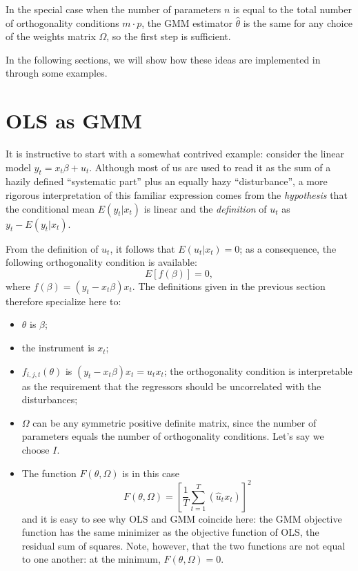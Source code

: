 In the special case when the number of parameters $n$ is equal to the
total number of orthogonality conditions $m \cdot p$, the GMM
estimator $\hat{\theta}$ is the same for any choice of the weights
matrix $\Omega$, so the first step is sufficient.

In the following sections, we will show how these ideas are
implemented in  through some examples.

\section{OLS as GMM}
\label{sec:gmm-ols}

It is instructive to start with a somewhat contrived example: consider
the linear model $y_t = x_t \beta + u_t$.  Although most of us
are used to read it as the sum of a hazily defined ``systematic part''
plus an equally hazy ``disturbance'', a more rigorous interpretation
of this familiar expression comes from the \emph{hypothesis} that the
conditional mean $E(y_t|x_t)$ is linear and the \emph{definition} of
$u_t$ as $y_t - E(y_t|x_t)$.

From the definition of $u_t$, it follows that $E(u_t|x_t) = 0$; as a
consequence, the following orthogonality condition is available:
\begin{equation}
  \label{eq:oc-ols}
  E \left[ f(\beta) \right] = 0 ,
\end{equation}
where $f(\beta) = (y_t - x_t \beta) x_t$. The definitions given in the
previous section therefore specialize here to:
\begin{itemize}
\item $\theta$ is $\beta$;
\item the instrument is $x_t$;
\item $f_{i,j,t}(\theta)$ is $(y_t - x_t \beta) x_t = u_t
  x_t$; the orthogonality condition is interpretable as the
  requirement that the regressors should be uncorrelated with the
  disturbances;
\item $\Omega$ can be any symmetric positive definite matrix, since
  the number of parameters equals the number of orthogonality
  conditions. Let's say we choose $I$.
\item The function $F(\theta, \Omega)$ is in this case
  \[
    F(\theta, \Omega) = \left[ \frac{1}{T} \sum_{t=1}^T (\hat{u}_t x_t) \right]^2
  \]
  and it is easy to see why OLS and GMM coincide here: the GMM
  objective function has the same minimizer as the objective function
  of OLS, the residual sum of squares. Note, however, that the two
  functions are not equal to one another: at the minimum, $F(\theta,
  \Omega) = 0$.
\end{itemize}

